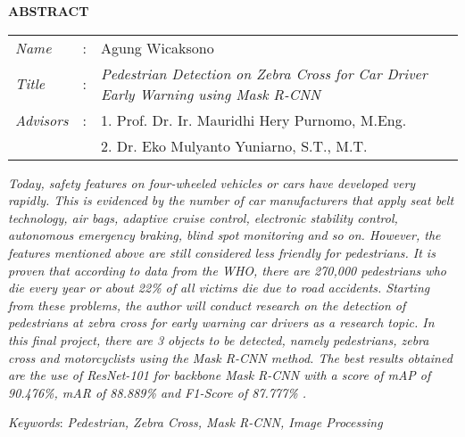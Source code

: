 \begin{center}
  \large\textbf{ABSTRACT}
\end{center}


\vspace{2ex}

\begingroup
  \setlength{\tabcolsep}{0pt}

  \noindent
  \begin{tabularx}{\textwidth}{l >{\centering}m{3em} X}
    \emph{Name}     &:& Agung Wicaksono \\

    \emph{Title}    &:& \emph{Pedestrian Detection on \textit{Zebra Cross} for Car Driver Early Warning using \textit{Mask R-CNN}} \\

    \emph{Advisors}  &:& 1. Prof. Dr. Ir. Mauridhi Hery Purnomo, M.Eng. \\
    				 & & 2. Dr. Eko Mulyanto Yuniarno, S.T., M.T. \\
  \end{tabularx}
\endgroup

\emph{Today, safety features on four-wheeled vehicles or cars have developed very rapidly. This is evidenced by the number of car manufacturers that apply seat belt technology, air bags, adaptive cruise control, electronic stability control, autonomous emergency braking, blind spot monitoring and so on. However, the features mentioned above are still considered less friendly for pedestrians. It is proven that according to data from the WHO, there are 270,000 pedestrians who die every year or about 22\% of all victims die due to road accidents. Starting from these problems, the author will conduct research on the detection of pedestrians at zebra cross for early warning car drivers as a research topic. In this final project, there are 3 objects to be detected, namely pedestrians, zebra cross and motorcyclists using the Mask R-CNN method. The best results obtained are the use of \textit{ResNet-101} for \textit{backbone Mask R-CNN} with a score of \textit{mAP} of 90.476\%, mAR of 88.889\% and \textit{F1-Score} of 87.777\% .}

\emph{Keywords}: \emph{Pedestrian, Zebra Cross, Mask R-CNN, Image Processing}
